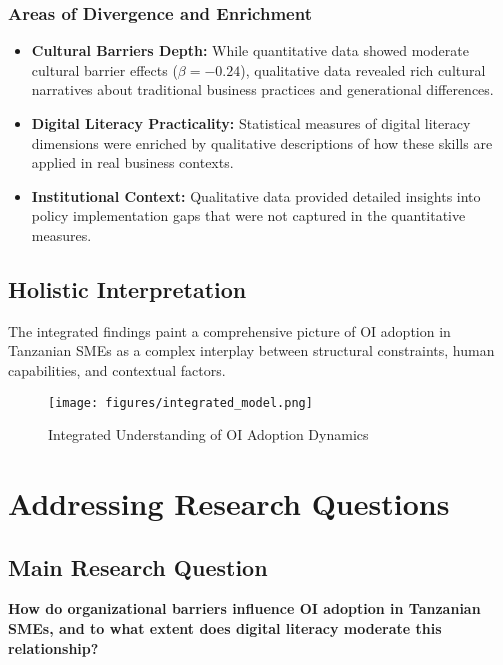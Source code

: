\subsubsection{Areas of Divergence and Enrichment}
\begin{itemize}
    \item \textbf{Cultural Barriers Depth:} While quantitative data showed moderate cultural barrier effects ($\beta = -0.24$), qualitative data revealed rich cultural narratives about traditional business practices and generational differences.

    \item \textbf{Digital Literacy Practicality:} Statistical measures of digital literacy dimensions were enriched by qualitative descriptions of how these skills are applied in real business contexts.

    \item \textbf{Institutional Context:} Qualitative data provided detailed insights into policy implementation gaps that were not captured in the quantitative measures.
\end{itemize}

\subsection{Holistic Interpretation}

The integrated findings paint a comprehensive picture of OI adoption in Tanzanian SMEs as a complex interplay between structural constraints, human capabilities, and contextual factors.

\begin{figure}[H]
\centering
\texttt{[image: figures/integrated\_model.png]}
\caption{Integrated Understanding of OI Adoption Dynamics}
\label{fig:integrated_model}
\end{figure}

\section{Addressing Research Questions}

\subsection{Main Research Question}

\textbf{How do organizational barriers influence OI adoption in Tanzanian SMEs, and to what extent does digital literacy moderate this relationship?}

